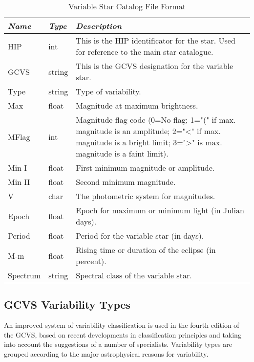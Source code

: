 \begin{table}[tb]
\begin{tabularx}{\textwidth}{l|l|X}\toprule
\emph{Name} & \emph{Type} & \emph{Description}\\\midrule
HIP      & int    & This is the HIP identificator for the star. Used for reference to the main star catalogue.\\%
GCVS     & string & This is the GCVS designation for the variable star.\\%
Type     & string & Type of variability.\\%
Max      & float  & Magnitude at maximum brightness.\\%
MFlag    & int    & Magnitude flag code (0=No flag; 1="(" if max. magnitude is an amplitude; 
                    2="\textless{}" if max. magnitude is a bright limit; 
                    3="\textgreater{}" is max. magnitude is a faint limit).\\%
Min I    & float  & First minimum magnitude or amplitude.\\%
Min II   & float  & Second minimum magnitude.\\%
V        & char   & The photometric system for magnitudes.\\%
Epoch    & float  & Epoch for maximum or minimum light (in Julian days).\\%
Period   & float  & Period for the variable star (in days).\\%
M-m      & float  & Rising time or duration of the eclipse (in percent).\\%
Spectrum & string & Spectral class of the variable star.\\\bottomrule
\end{tabularx}
\caption{Variable Star Catalog File Format}
\label{tab:sec:StarCatalogues:VariableStars}
\end{table}

\subsection{GCVS Variability Types}\label{gcvs-variability-types}

An improved system of variability classification is used in the fourth
edition of the GCVS, based on recent developments in classification
principles and taking into account the suggestions of a number of
specialists. Variability types are grouped according to the major
astrophysical reasons for variability.

